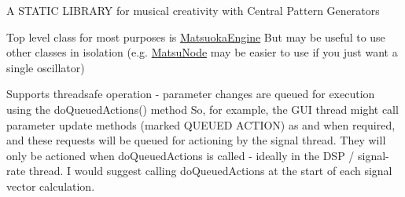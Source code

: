A S\+T\+A\+T\+IC L\+I\+B\+R\+A\+RY for musical creativity with Central Pattern Generators

Top level class for most purposes is \mbox{\hyperlink{classMatsuokaEngine}{Matsuoka\+Engine}} But may be useful to use other classes in isolation (e.\+g. \mbox{\hyperlink{classMatsuNode}{Matsu\+Node}} may be easier to use if you just want a single oscillator)

Supports threadsafe operation -\/ parameter changes are queued for execution using the do\+Queued\+Actions() method So, for example, the G\+UI thread might call parameter update methods (marked Q\+U\+E\+U\+ED A\+C\+T\+I\+ON) as and when required, and these requests will be queued for actioning by the signal thread. They will only be actioned when do\+Queued\+Actions is called -\/ ideally in the D\+SP / signal-\/rate thread. I would suggest calling do\+Queued\+Actions at the start of each signal vector calculation. 